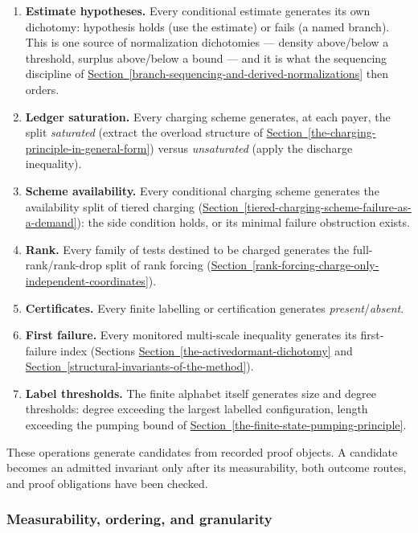 \documentclass[
  11pt,
]{article}
\providecommand{\tightlist}{%
  \setlength{\itemsep}{0pt}\setlength{\parskip}{0pt}}
\theoremstyle{definition}
\newcommand{\secref}[1]{\hyperref[#1]{Section~\ref*{#1}}}
\begin{document}
\begin{enumerate}
\def\labelenumi{\arabic{enumi}.}
\tightlist
\item
  \textbf{Estimate hypotheses.} Every conditional estimate generates its
  own dichotomy: hypothesis holds (use the estimate) or fails (a named
  branch). This is one source of normalization dichotomies ---
  density above/below a threshold, surplus above/below a bound --- and
  it is what the sequencing discipline of \secref{branch-sequencing-and-derived-normalizations} then orders.
\item
  \textbf{Ledger saturation.} Every charging scheme generates, at each
  payer, the split \emph{saturated} (extract the overload structure of
  \secref{the-charging-principle-in-general-form}) versus \emph{unsaturated} (apply the discharge
  inequality).
\item
  \textbf{Scheme availability.} Every conditional charging scheme
  generates the availability split of tiered charging (\secref{tiered-charging-scheme-failure-as-a-demand}):
  the side condition holds, or its minimal failure obstruction exists.
\item
  \textbf{Rank.} Every family of tests destined to be charged generates
  the full-rank/rank-drop split of rank forcing (\secref{rank-forcing-charge-only-independent-coordinates}).
\item
  {\raggedright
  \textbf{Certificates.} Every finite labelling or certification
  generates \mbox{\emph{present}/\emph{absent}}.\par}
\item
  \textbf{First failure.} Every monitored multi-scale inequality
  generates its first-failure index (Sections \secref{the-activedormant-dichotomy} and \secref{structural-invariants-of-the-method}).
\item
  \textbf{Label thresholds.} The finite alphabet itself generates size
  and degree thresholds: degree exceeding the largest labelled
  configuration, length exceeding the pumping bound of \secref{the-finite-state-pumping-principle}.
\end{enumerate}

These operations generate candidates from recorded proof objects. A
candidate becomes an admitted invariant only after its measurability,
both outcome routes, and proof obligations have been checked.



\subsubsection{Measurability, ordering, and
granularity}\label{measurability-ordering-and-granularity}
\end{document}
